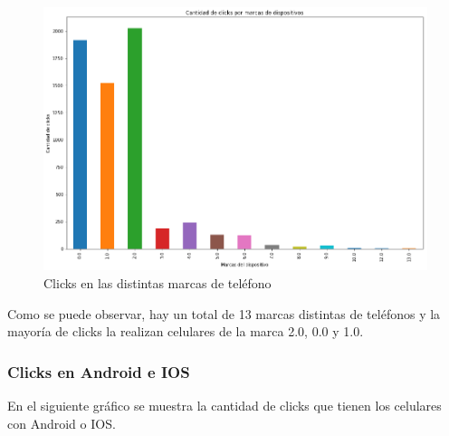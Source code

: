 \documentclass[a4paper, 12pt]{article}
\begin{document}
		\begin{figure}[H]
			\centering
			\includegraphics[width=\textwidth]{images/clicks/clicks_brand.png}
			\caption{Clicks en las distintas marcas de teléfono}
		\end{figure}


		 Como se puede observar, hay un total de 13 marcas distintas de teléfonos y la mayoría de clicks la realizan
		celulares de la marca 2.0, 0.0 y 1.0.

	\subsubsection{Clicks en Android e IOS}
		 En el siguiente gráfico se muestra la cantidad de clicks que tienen los celulares con Android o IOS.
\end{document}
